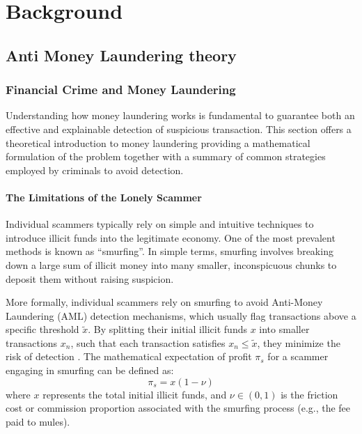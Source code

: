 \chapter{Background}\label{background}
\section{Anti Money Laundering theory}
\subsection{Financial Crime and Money Laundering}
\label{moneyLaundering}
Understanding how money laundering works is fundamental to guarantee both an effective and explainable detection of suspicious transaction. 
This section offers a theoretical introduction to money laundering providing a mathematical formulation of the problem together with a summary of common strategies employed by criminals to avoid detection.
\subsubsection{The Limitations of the Lonely Scammer}
Individual scammers typically rely on simple and intuitive techniques to introduce illicit funds into the legitimate economy. One of the most prevalent methods is known as ``smurfing''. In simple terms, smurfing involves breaking down a large sum of illicit money into many smaller, inconspicuous chunks to deposit them without raising suspicion. 

More formally, individual scammers rely on smurfing to avoid Anti-Money Laundering (AML) detection mechanisms, which usually flag transactions above a specific threshold $\tilde{x}$. By splitting their initial illicit funds $x$ into smaller transactions $x_n$, such that each transaction satisfies $x_n \leq \tilde{x}$, they minimize the risk of detection \cite{contreras2026strategic}. The mathematical expectation of profit $\pi_s$ for a scammer engaging in smurfing can be defined as:
\begin{equation}
    \pi_s = x(1-\nu)
\end{equation}
where $x$ represents the total initial illicit funds, and $\nu \in (0,1)$ is the friction cost or commission proportion associated with the smurfing process (e.g., the fee paid to mules). 

